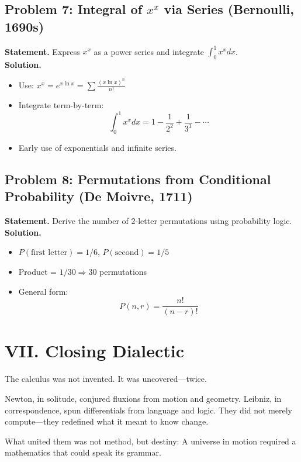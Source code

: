 \documentclass[9pt]{article}
\begin{document}
\newpage

\subsection*{Problem 7: Integral of \( x^x \) via Series (Bernoulli, 1690s)}
\textbf{Statement.} Express \( x^x \) as a power series and integrate \( \int_0^1 x^x dx \). \\
\textbf{Solution.}
\begin{itemize}
  \item Use: \( x^x = e^{x \ln x} = \sum \frac{(x \ln x)^n}{n!} \)
  \item Integrate term-by-term:
  \[
  \int_0^1 x^x dx = 1 - \frac{1}{2^2} + \frac{1}{3^3} - \cdots
  \]
  \item Early use of exponentials and infinite series.
\end{itemize}

\newpage

\subsection*{Problem 8: Permutations from Conditional Probability (De Moivre, 1711)}
\textbf{Statement.} Derive the number of 2-letter permutations using probability logic. \\
\textbf{Solution.}
\begin{itemize}
  \item \( P(\text{first letter}) = 1/6 \), \( P(\text{second}) = 1/5 \)
  \item Product = \( 1/30 \Rightarrow 30 \) permutations
  \item General form:
  \[
  P(n, r) = \frac{n!}{(n - r)!}
  \]
\end{itemize}

\newpage

\section*{VII. Closing Dialectic}

The calculus was not invented. It was uncovered—twice.

\vspace{1cm}
\noindent
Newton, in solitude, conjured fluxions from motion and geometry. Leibniz, in correspondence, spun differentials from language and logic. They did not merely compute—they redefined what it meant to know change.
\vspace{1cm}

\noindent
What united them was not method, but destiny:  
A universe in motion required a mathematics that could speak its grammar.
\end{document}

